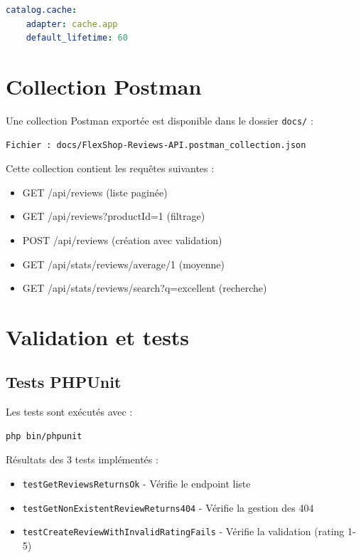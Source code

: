 \documentclass[11pt,a4paper]{article}
\begin{document}
\begin{lstlisting}[language=YAML]
catalog.cache:
    adapter: cache.app
    default_lifetime: 60
\end{lstlisting}

\section{Collection Postman}

Une collection Postman exportée est disponible dans le dossier \texttt{docs/} :

\begin{verbatim}
Fichier : docs/FlexShop-Reviews-API.postman_collection.json
\end{verbatim}

Cette collection contient les requêtes suivantes :
\begin{itemize}
    \item GET /api/reviews (liste paginée)
    \item GET /api/reviews?productId=1 (filtrage)
    \item POST /api/reviews (création avec validation)
    \item GET /api/stats/reviews/average/1 (moyenne)
    \item GET /api/stats/reviews/search?q=excellent (recherche)
\end{itemize}

\section{Validation et tests}

\subsection{Tests PHPUnit}

Les tests sont exécutés avec :

\begin{lstlisting}
php bin/phpunit
\end{lstlisting}

Résultats des 3 tests implémentés :
\begin{itemize}
    \item \texttt{testGetReviewsReturnsOk} - Vérifie le endpoint liste
    \item \texttt{testGetNonExistentReviewReturns404} - Vérifie la gestion des 404
    \item \texttt{testCreateReviewWithInvalidRatingFails} - Vérifie la validation (rating 1-5)
\end{itemize}
\end{document}
